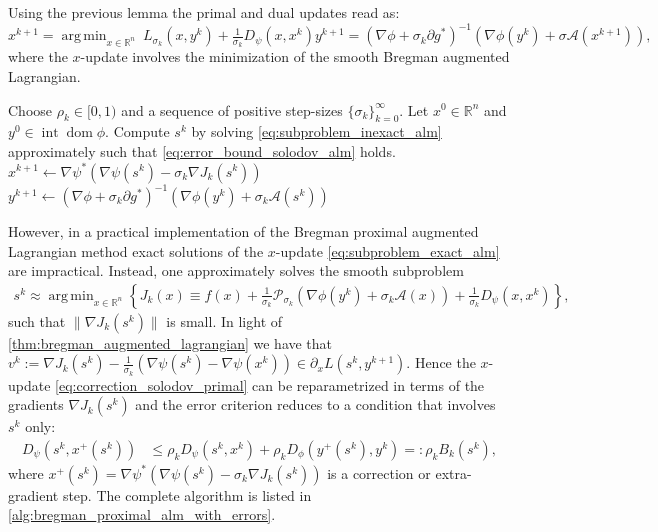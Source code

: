 \documentclass[11pt,onecolumn]{article}
\DeclareMathOperator*{\argmin}{arg\,min}
\DeclareMathOperator{\dom}{dom}
\DeclareMathOperator{\intr}{int}
\newcommand{\bR}{\mathbb{R}}
\theoremstyle{remark}
\begin{document}
Using the previous lemma the primal and dual updates read as:
\begin{subequations}
\begin{equation} \label{eq:subproblem_exact_alm}
x^{k+1} = \argmin_{x \in \bR^n} ~L_{\sigma_k}(x, y^k)+\tfrac{1}{\sigma_k}D_\psi(x,x^k)
\end{equation}
\begin{equation} \label{eq:dual_update}
y^{k+1} = (\nabla \phi + \sigma_k \partial g^*)^{-1}(\nabla \phi(y^k) + \sigma \mathcal{A}(x^{k+1})),
\end{equation}
\end{subequations}
where the $x$-update involves the minimization of the smooth Bregman augmented Lagrangian.

\begin{algorithm}[t!]
\caption{Bregman proximal augmented Lagrangian method for convex convex-composite problem}
\label{alg:bregman_proximal_alm_with_errors}
\begin{algorithmic}
\REQUIRE Choose $\rho_k \in [0, 1)$ and a sequence of positive step-sizes $\{\sigma_k\}_{k=0}^\infty$. Let $x^0 \in \bR^n$ and $y^0 \in \intr \dom \phi$.
    \STATE Compute $s^k$ by solving \cref{eq:subproblem_inexact_alm} approximately such that \cref{eq:error_bound_solodov_alm} holds.
    \STATE $x^{k+1} \gets \nabla \psi^*(\nabla \psi(s^k) - \sigma_k \nabla J_k(s^k))$
    \STATE $y^{k+1} \gets (\nabla \phi + \sigma_k \partial g^*)^{-1}(\nabla \phi(y^k) + \sigma_k \mathcal{A}(s^k))$
\ENDFOR
\end{algorithmic}
\end{algorithm}
However, in a practical implementation of the Bregman proximal augmented Lagrangian method exact solutions of the $x$-update \cref{eq:subproblem_exact_alm} are impractical. Instead, one approximately solves the smooth subproblem
\begin{align} \label{eq:subproblem_inexact_alm}
    s^k \approx \argmin_{x \in \bR^n }\left\{ J_k(x)\equiv f(x) + \tfrac{1}{\sigma_k}\mathcal{P}_{\sigma_k}(\nabla \phi(y^k) + \sigma_k \mathcal{A}(x)) + \tfrac{1}{\sigma_k}D_\psi(x,x^k)\right\},
\end{align}
such that $\|\nabla J_k(s^k)\|$ is small.
In light of \cref{thm:bregman_augmented_lagrangian} we have that $v^k:=\nabla J_k(s^k) -\frac{1}{\sigma_k}(\nabla \psi(s^k) - \nabla \psi(x^k)) \in \partial_x L(s^k, y^{k+1})$.
Hence the $x$-update \cref{eq:correction_solodov_primal} can be reparametrized in terms of the gradients $\nabla J_k(s^k)$ and the error criterion reduces to a condition that involves $s^k$ only:
\begin{align}\label{eq:error_bound_solodov_alm}
D_\psi(s^{k},x^+(s^k))&\leq \rho_k D_\psi(s^{k},x^k) + \rho_k D_\phi(y^{+}(s^k), y^k) =: \rho_k B_k(s^k),
\end{align}
where $x^+(s^k) = \nabla \psi^*(\nabla \psi(s^k) - \sigma_k \nabla J_k(s^k))$ is a correction or extra-gradient step.
The complete algorithm is listed in \cref{alg:bregman_proximal_alm_with_errors}.
\end{document}
